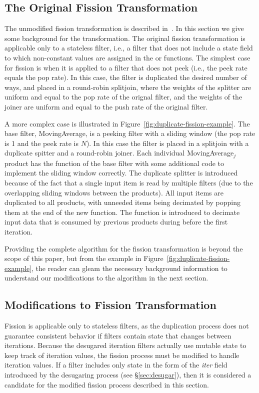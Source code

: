 \subsection{The Original Fission Transformation}

The unmodified fission transformation is described
in~\cite{streamit-asplos}. In this section we give some background for
the transformation. The original fission transformation is applicable
only to a stateless filter, i.e., a filter that does not include a state
field to which non-constant values are assigned in the \prework or
\work functions. The simplest case for fission is when it is applied
to a filter that does not peek (i.e., the peek rate equals the pop
rate). In this case, the filter is duplicated the desired number of
ways, and placed in a round-robin splitjoin, where the weights of the
splitter are uniform and equal to the pop rate of the orignal
filter, and the weights of the joiner are uniform and equal to the
push rate of the original filter.

A more complex case is illustrated in
Figure~\ref{fig:duplicate-fission-example}. The base filter,
MovingAverage, is a peeking filter with a sliding window (the pop rate
is 1 and the peek rate is $N$). In this case the filter is placed in a
splitjoin with a duplicate spitter and a round-robin joiner. Each
individual MovingAverage$_j$ product has the \work function of the
base filter with some additional code to implement the sliding window
correctly. The duplicate splitter is introduced because of the fact
that a single input item is read by multiple filters (due to the
overlapping sliding windows between the products). All input items are
duplicated to all products, with unneeded items being decimated by
popping them at the end of the new \work function.  The \prework
function is introduced to decimate input data that is consumed by
previous products during before the first iteration.  

Providing the complete algorithm for the fission transformation is
beyond the scope of this paper, but from the example
in Figure~\ref{fig:duplicate-fission-example}, the reader can
gleam the necessary background information to understand our
modifications to the algorithm in the next section.

\subsection{Modifications to Fission Transformation}

Fission is applicable only to stateless filters, as the duplication
process does not guarantee consistent behavior if filters contain
state that changes between iterations. Because the desugared iteration
filters actually use mutable state to keep track of iteration values,
the fission process must be modified to handle iteration values. If a
filter includes only state in the form of the {\it iter} field
introduced by the desugaring process (see \S\ref{sec:desugar}), then
it is considered a candidate for the modified fission process
described in this section.

